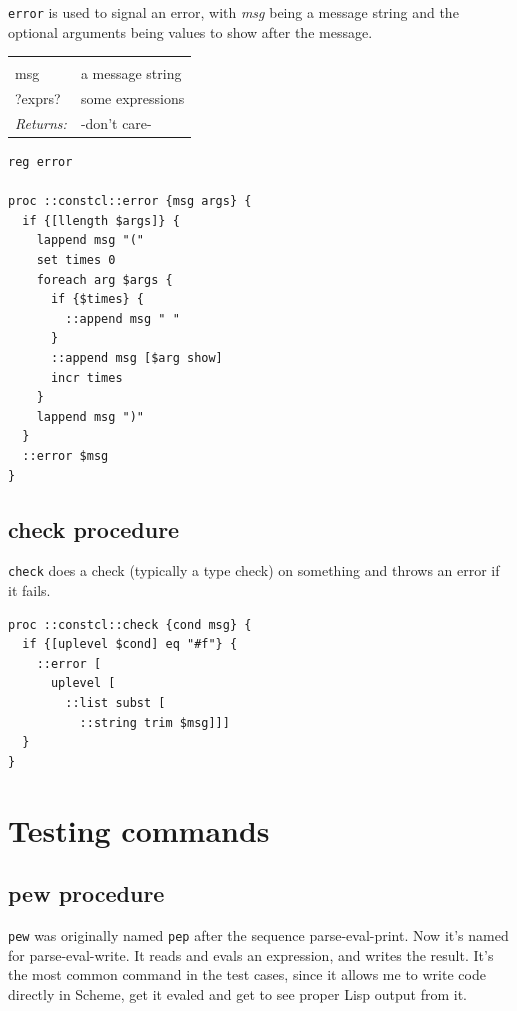 \documentclass[twoside,9pt]{report}
\begin{document}
\texttt{error} is used to signal an error, with \emph{msg} being a message string and the optional arguments being values to show after the message.

\noindent\begin{tabular}{ |p{1.5cm} p{8cm}| }
\hline
\rowcolor[HTML]{CCCCCC} \multicolumn{2}{|l|}{\bf error (public)} \\
msg & a message string \\
?exprs? & some expressions \\
\textit{Returns:} & -don't care- \\
\hline
\end{tabular}
\begin{lstlisting}
reg error
 
proc ::constcl::error {msg args} {
  if {[llength $args]} {
    lappend msg "("
    set times 0
    foreach arg $args {
      if {$times} {
        ::append msg " "
      }
      ::append msg [$arg show]
      incr times
    }
    lappend msg ")"
  }
  ::error $msg
}
\end{lstlisting}
\subsection{check procedure}
\label{check-procedure}


\texttt{check} does a check (typically a type check) on something and throws an error if it fails.

\begin{lstlisting}
proc ::constcl::check {cond msg} {
  if {[uplevel $cond] eq "#f"} {
    ::error [
      uplevel [
        ::list subst [
          ::string trim $msg]]]
  }
}
\end{lstlisting}
\section{Testing commands}
\label{testing-commands}
\subsection{pew procedure}
\label{pew-procedure}


\texttt{pew} was originally named \texttt{pep} after the sequence parse-eval-print. Now it's named for parse-eval-write. It reads and evals an expression, and writes the result. It's the most common command in the test cases, since it allows me to write code directly in Scheme, get it evaled and get to see proper Lisp output from it.
\end{document}
